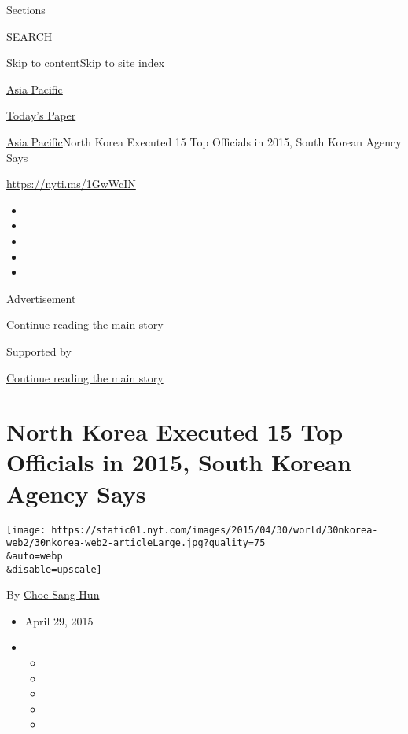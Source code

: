 Sections

SEARCH

\protect\hyperlink{site-content}{Skip to
content}\protect\hyperlink{site-index}{Skip to site index}

\href{https://www.nytimes.com/section/world/asia}{Asia Pacific}

\href{https://myaccount.nytimes.com/auth/login?response_type=cookie\&client_id=vi}{}

\href{https://www.nytimes.com/section/todayspaper}{Today's Paper}

\href{/section/world/asia}{Asia Pacific}\textbar{}North Korea Executed
15 Top Officials in 2015, South Korean Agency Says

\url{https://nyti.ms/1GwWcIN}

\begin{itemize}
\item
\item
\item
\item
\item
\end{itemize}

Advertisement

\protect\hyperlink{after-top}{Continue reading the main story}

Supported by

\protect\hyperlink{after-sponsor}{Continue reading the main story}

\hypertarget{north-korea-executed-15-top-officials-in-2015-south-korean-agency-says}{%
\section{North Korea Executed 15 Top Officials in 2015, South Korean
Agency
Says}\label{north-korea-executed-15-top-officials-in-2015-south-korean-agency-says}}

\texttt{[image: https://static01.nyt.com/images/2015/04/30/world/30nkorea-web2/30nkorea-web2-articleLarge.jpg?quality=75\\\&auto=webp\\\&disable=upscale]}

By \href{http://www.nytimes.com/by/choe-sang-hun}{Choe Sang-Hun}

\begin{itemize}
\item
  April 29, 2015
\item
  \begin{itemize}
  \item
  \item
  \item
  \item
  \item
  \end{itemize}
\end{itemize}

